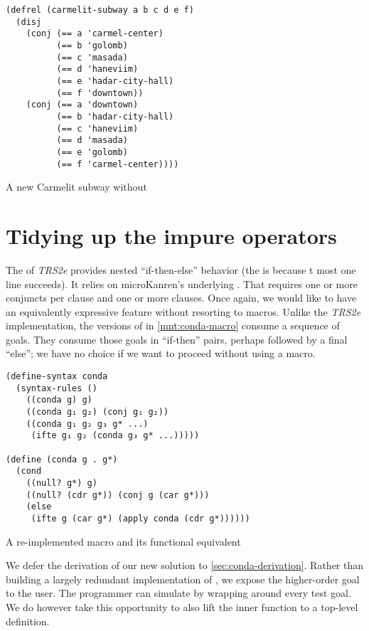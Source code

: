 \documentclass[sigplan,balance=true,pbalance=true,natbib=false]{acmart}
\begin{document}
\begin{listing}[h]
  \begin{verbatim}
(defrel (carmelit-subway a b c d e f)
  (disj
    (conj (== a 'carmel-center)
          (== b 'golomb)
          (== c 'masada)
          (== d 'haneviim)
          (== e 'hadar-city-hall)
          (== f 'downtown))
    (conj (== a 'downtown)
          (== b 'hadar-city-hall)
          (== c 'haneviim)
          (== d 'masada)
          (== e 'golomb)
          (== f 'carmel-center))))
  \end{verbatim}
  \caption{A new Carmelit subway without }\label{mnt:new-carmelit}
\end{listing}

\section{Tidying up the impure operators}\label{sec:impure}

The  of \emph{TRS2e} provides nested
\enquote{if-then-else} behavior (the  is because
t most one line succeeds). It relies on microKanren's
underlying . That  requires one or
more conjuncts per clause and one or more clauses. Once again, we
would like to have an equivalently expressive feature without
resorting to macros. Unlike the \emph{TRS2e} implementation, the
versions of  in \cref{mnt:conda-macro} consume a
sequence of goals. They consume those goals in \enquote{if-then}
pairs, perhaps followed by a final \enquote{else}; we have no choice
if we want to proceed without using a macro.

\begin{listing}
\begin{verbatim}
(define-syntax conda
  (syntax-rules ()
    ((conda g) g)
    ((conda g₁ g₂) (conj g₁ g₂))
    ((conda g₁ g₂ g₃ g* ...)
     (ifte g₁ g₂ (conda g₃ g* ...)))))

(define (conda g . g*)
  (cond
    ((null? g*) g)
    ((null? (cdr g*)) (conj g (car g*)))
    (else
     (ifte g (car g*) (apply conda (cdr g*))))))
\end{verbatim}
  \caption{A re-implemented  macro and its functional equivalent}\label{mnt:conda-macro}
\end{listing}

We defer the derivation of our new  solution to
\cref{sec:conda-derivation}. Rather than building a largely redundant
implementation of , we expose the higher-order goal
 to the user. The programmer can simulate
 by wrapping  around every test
goal. We do however take this opportunity to also lift the inner
function  to a top-level definition.
\end{document}
